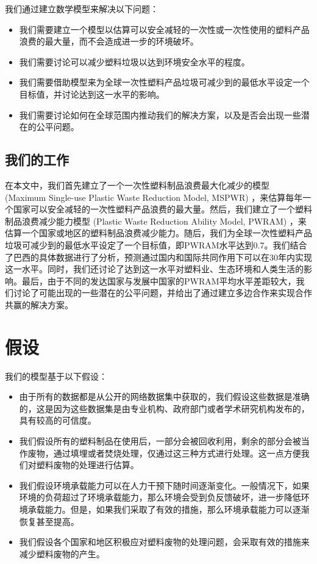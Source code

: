 \documentclass[UTF8, fontset=windows]{mcmthesis}
\begin{document}
我们通过建立数学模型来解决以下问题：

\begin{itemize}
  \item 我们需要建立一个模型以估算可以安全减轻的一次性或一次性使用的塑料产品浪费的最大量，而不会造成进一步的环境破坏。
  \item 我们需要讨论可以减少塑料垃圾以达到环境安全水平的程度。
  \item 我们需要借助模型来为全球一次性塑料产品垃圾可减少到的最低水平设定一个目标值，并讨论达到这一水平的影响。
  \item 我们需要讨论如何在全球范围内推动我们的解决方案，以及是否会出现一些潜在的公平问题。
\end{itemize}

\subsection{我们的工作}

在本文中，我们首先建立了一个一次性塑料制品浪费最大化减少的模型 (Maximum Single-use Plastic Waste Reduction Model, MSPWR) ，来估算每年一个国家可以安全减轻的一次性塑料产品浪费的最大量。然后，我们建立了一个塑料制品浪费减少能力模型 (Plastic Waste Reduction Ability Model, PWRAM) ，来估算一个国家或地区的塑料制品浪费减少能力。随后，我们为全球一次性塑料产品垃圾可减少到的最低水平设定了一个目标值，即PWRAM水平达到0.7。我们结合了巴西的具体数据进行了分析，预测通过国内和国际共同作用下可以在30年内实现这一水平。同时，我们还讨论了达到这一水平对塑料业、生态环境和人类生活的影响。最后，由于不同的发达国家与发展中国家的PWRAM平均水平差距较大，我们讨论了可能出现的一些潜在的公平问题，并给出了通过建立多边合作来实现合作共赢的解决方案。

\section{假设}

我们的模型基于以下假设：

\begin{itemize}
  \item 由于所有的数据都是从公开的网络数据集中获取的，我们假设这些数据是准确的，这是因为这些数据集是由专业机构、政府部门或者学术研究机构发布的，具有较高的可信度。
  \item 我们假设所有的塑料制品在使用后，一部分会被回收利用，剩余的部分会被当作废物，通过填埋或者焚烧处理，仅通过这三种方式进行处理。这一点方便我们对塑料废物的处理进行估算。
  \item 我们假设环境承载能力可以在人力干预下随时间逐渐变化。一般情况下，如果环境的负荷超过了环境承载能力，那么环境会受到负反馈破坏，进一步降低环境承载能力。但是，如果我们采取了有效的措施，那么环境承载能力可以逐渐恢复甚至提高。
  \item 我们假设各个国家和地区积极应对塑料废物的处理问题，会采取有效的措施来减少塑料废物的产生。
\end{itemize}
\end{document}
